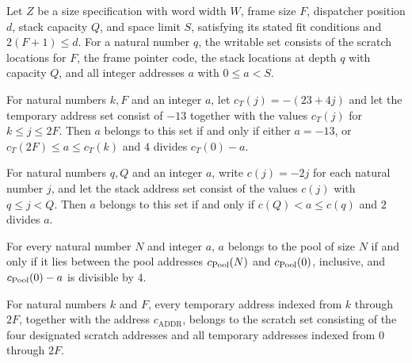 \begin{definition}
\label{Light.Compiler.Writable}
\leanok
{}
Let $Z$ be a size specification with word width $W$, frame size $F$, dispatcher position
$d$, stack capacity $Q$, and space limit $S$, satisfying its stated fit conditions and
$2(F+1)\le d$. For a natural number $q$, the writable set consists of the scratch
locations for $F$, the frame pointer code, the stack locations at depth $q$ with
capacity $Q$, and all integer addresses $a$ with $0\le a<S$.
\end{definition}

\begin{theorem}
\label{Light.Compiler.mem_temps_iff}
\leanok
{}
For natural numbers $k,F$ and an integer $a$, let $c_T(j)=-(23+4j)$ and let the
temporary address set consist of $-13$ together with the values $c_T(j)$ for $k\le j\le
2F$. Then $a$ belongs to this set if and only if either $a=-13$, or $c_T(2F)\le a\le
c_T(k)$ and $4$ divides $c_T(0)-a$.
\end{theorem}

\begin{theorem}
\label{Light.Compiler.mem_stack_iff}
\leanok
{}
For natural numbers $q,Q$ and an integer $a$, write $c(j)=-2j$ for each natural number
$j$, and let the stack address set consist of the values $c(j)$ with $q\le j<Q$. Then
$a$ belongs to this set if and only if $c(Q)<a\le c(q)$ and $2$ divides $a$.
\end{theorem}

\begin{theorem}
\label{Light.Compiler.mem_pool_iff}
\leanok
{}
For every natural number $N$ and integer $a$, $a$ belongs to the pool of size $N$ if and
only if it lies between the pool addresses $c_{\rm Pool}(N)$ and $c_{\rm Pool}(0)$,
inclusive, and $c_{\rm Pool}(0)-a$ is divisible by $4$.
\end{theorem}

\begin{theorem}
\label{Light.Compiler.temps_subset_scratch}
\leanok
{}
For natural numbers $k$ and $F$, every temporary address indexed from $k$ through $2F$,
together with the address $c_{\mathrm{ADDR}}$, belongs to the scratch set consisting of
the four designated scratch addresses and all temporary addresses indexed from $0$
through $2F$.
\end{theorem}

